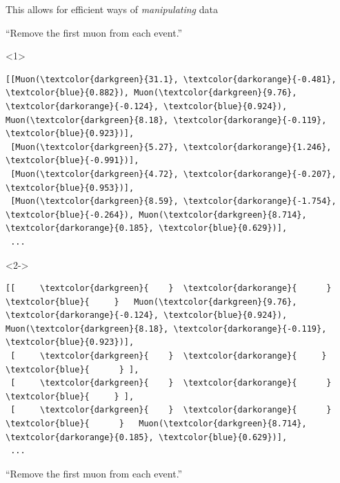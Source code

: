 \documentclass[aspectratio=169]{beamer}
\begin{document}
\begin{frame}[fragile]{This allows for efficient ways of {\it manipulating} data}
\vspace{0.25 cm}

``Remove the first muon from each event.'' 

\scriptsize
\begin{onlyenv}<1>
\begin{Verbatim}[commandchars=\\\{\}]
[[Muon(\textcolor{darkgreen}{31.1}, \textcolor{darkorange}{-0.481}, \textcolor{blue}{0.882}), Muon(\textcolor{darkgreen}{9.76}, \textcolor{darkorange}{-0.124}, \textcolor{blue}{0.924}), Muon(\textcolor{darkgreen}{8.18}, \textcolor{darkorange}{-0.119}, \textcolor{blue}{0.923})],
 [Muon(\textcolor{darkgreen}{5.27}, \textcolor{darkorange}{1.246}, \textcolor{blue}{-0.991})],
 [Muon(\textcolor{darkgreen}{4.72}, \textcolor{darkorange}{-0.207}, \textcolor{blue}{0.953})],
 [Muon(\textcolor{darkgreen}{8.59}, \textcolor{darkorange}{-1.754}, \textcolor{blue}{-0.264}), Muon(\textcolor{darkgreen}{8.714}, \textcolor{darkorange}{0.185}, \textcolor{blue}{0.629})],
 ...
\end{Verbatim}
\end{onlyenv}\begin{onlyenv}<2->
\begin{Verbatim}[commandchars=\\\{\}]
[[     \textcolor{darkgreen}{    }  \textcolor{darkorange}{      }  \textcolor{blue}{     }   Muon(\textcolor{darkgreen}{9.76}, \textcolor{darkorange}{-0.124}, \textcolor{blue}{0.924}), Muon(\textcolor{darkgreen}{8.18}, \textcolor{darkorange}{-0.119}, \textcolor{blue}{0.923})],
 [     \textcolor{darkgreen}{    }  \textcolor{darkorange}{     }  \textcolor{blue}{      } ],
 [     \textcolor{darkgreen}{    }  \textcolor{darkorange}{      }  \textcolor{blue}{     } ],
 [     \textcolor{darkgreen}{    }  \textcolor{darkorange}{      }  \textcolor{blue}{      }   Muon(\textcolor{darkgreen}{8.714}, \textcolor{darkorange}{0.185}, \textcolor{blue}{0.629})],
 ...
\end{Verbatim}
\end{onlyenv}
\normalsize

\vspace{0.5 cm}
``Remove the first muon from each event.'' 


\end{frame}
\end{document}
